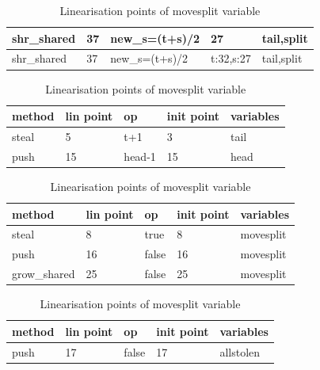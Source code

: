 \documentclass{sig-alternate-br}
\begin{document}
\begin{table}[h]
\begin{subtable}[h]{0.45\textwidth}
\begin{tabular}{|l|l|l|l|l|}
			shr\_shared  & 37                 & new\_s=(t+s)/2      & 27         & tail,split             \\ \hline
			shr\_shared  & 37                 & new\_s=(t+s)/2      & t:32,s:27                  & tail,split             \\ \hline
		\end{tabular}
		\caption{Linearisation points of o\_split variable.}
		\label{tab:osplit}
	\end{subtable}
	\hfill
	\begin{subtable}[h]{0.45\textwidth}
		\centering
		\begin{tabular}{|l|l|l|l|l|}
			\hline
			\textbf{method} & \textbf{lin point} & \textbf{op} & \textbf{init point} & \textbf{variables} \\ \hline
			steal           & 5                  & t+1         & 3                   & tail           \\ \hline
			push            & 15                 & head-1      & 15                  & head               \\ \hline
		\end{tabular}
		\caption{Linearisation points of tail variable}
		\label{tab:tail}
	\end{subtable}
	\begin{subtable}[h]{0.45\textwidth}
		\centering
		\begin{tabular}{|l|l|l|l|l|}
			\hline
			\textbf{method} & \textbf{lin point} & \textbf{op} & \textbf{init point} & \textbf{variables} \\ \hline
			steal           & 8                  & true        & 8                   & movesplit          \\ \hline
			push            & 16                 & false       & 16                  & movesplit          \\ \hline
			grow\_shared    & 25                 & false       & 25                  & movesplit          \\ \hline
		\end{tabular}
		\caption{Linearisation points of movesplit variable}
		\label{tab:move}
	\end{subtable}
	\begin{subtable}[h]{0.45\textwidth}
		\centering
		\begin{tabular}{|l|l|l|l|l|}
			\hline
			\textbf{method} & \textbf{lin point} & \textbf{op} & \textbf{init point} & \textbf{variables} \\ \hline
			push            & 17                 & false       & 17                  & allstolen          \\ \hline

\end{tabular}
\end{subtable}
\end{table}
\end{document}
